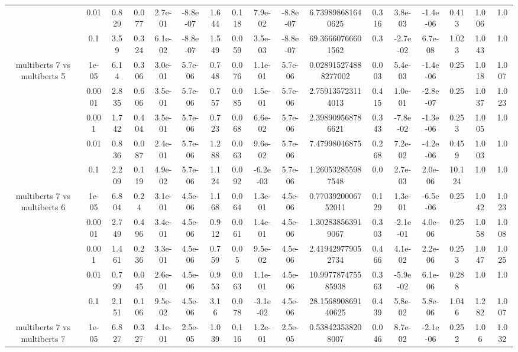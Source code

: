 \begin{tabular}{|c|c|c|c|c|c|c|c|c|c|c|c|c|c|c|c|c|}
 & 0.01 & 0.829 & 0.077 & 2.7e-01 & -8.8e-07 & 1.644 & 0.118 & 7.9e-02 & -8.8e-07 & 6.739898681640625 & 0.316 & 3.8e-03 & -1.4e-06 & 0.413 & 1.006 & 1.0 \\
 & 0.1 & 3.59 & 0.324 & 6.1e-02 & -8.8e-07 & 1.549 & 0.059 & 3.5e-03 & -8.8e-07 & 69.36660766601562 & 0.3 & -2.7e-02 & 6.7e-08 & 1.023 & 1.043 & 1.0 \\
\hline
\multirow{5}{*}{multiberts 7 vs multiberts 5} & 1e-05 & 6.14 & 0.306 & 3.0e-01 & 5.7e-06 & 0.748 & 0.076 & 1.1e-01 & 5.7e-06 & 0.028915274888277002 & 0.003 & 5.4e-03 & -1.4e-06 & 0.25 & 1.018 & 1.007 \\
 & 0.0001 & 2.835 & 0.606 & 3.5e-01 & 5.7e-06 & 0.757 & 0.085 & 1.5e-01 & 5.7e-06 & 2.759135723114013 & 0.415 & 1.0e-01 & -2.8e-07 & 0.25 & 1.037 & 1.023 \\
 & 0.001 & 1.742 & 0.404 & 3.5e-01 & 5.7e-06 & 0.723 & 0.068 & 6.6e-02 & 5.7e-06 & 2.398909568786621 & 0.343 & -7.8e-02 & -1.3e-06 & 0.253 & 1.005 & 1.0 \\
 & 0.01 & 0.836 & 0.087 & 2.4e-01 & 5.7e-06 & 1.288 & 0.063 & 9.6e-02 & 5.7e-06 & 7.47998046875 & 0.268 & 7.2e-02 & -4.2e-06 & 0.459 & 1.003 & 1.0 \\
 & 0.1 & 2.209 & 0.119 & 4.9e-02 & 5.7e-06 & 1.124 & 0.092 & -6.2e-03 & 5.7e-06 & 1.260532855987548 & 0.0 & 2.7e-03 & 2.0e-06 & 10.124 & 1.0 & 1.0 \\
\hline
\multirow{5}{*}{multiberts 7 vs multiberts 6} & 1e-05 & 6.804 & 0.24 & 3.1e-01 & 4.5e-06 & 1.168 & 0.064 & 1.3e-01 & 4.5e-06 & 0.7703920006752011 & 0.129 & 1.3e-01 & -6.5e-06 & 0.25 & 1.042 & 1.023 \\
 & 0.0001 & 2.749 & 0.496 & 3.4e-01 & 4.5e-06 & 0.912 & 0.061 & 1.4e-01 & 4.5e-06 & 1.302838563919067 & 0.303 & -2.1e-01 & 4.0e-06 & 0.25 & 1.058 & 1.008 \\
 & 0.001 & 1.461 & 0.236 & 3.3e-01 & 4.5e-06 & 0.759 & 0.05 & 9.5e-02 & 4.5e-06 & 2.419429779052734 & 0.466 & 4.1e-02 & 2.2e-06 & 0.253 & 1.047 & 1.025 \\
 & 0.01 & 0.799 & 0.045 & 2.6e-01 & 4.5e-06 & 0.953 & 0.063 & 1.1e-01 & 4.5e-06 & 10.997787475585938 & 0.363 & -5.9e-02 & 6.1e-06 & 0.288 & 1.0 & 1.0 \\
 & 0.1 & 2.151 & 0.106 & 9.5e-02 & 4.5e-06 & 3.16 & 0.078 & -3.1e-02 & 4.5e-06 & 28.156890869140625 & 0.439 & 5.8e-02 & 5.8e-06 & 1.046 & 1.282 & 1.007 \\
\hline
\multirow{5}{*}{multiberts 7 vs multiberts 7} & 1e-05 & 6.827 & 0.327 & 4.1e-01 & 2.5e-05 & 1.039 & 0.116 & 1.2e-01 & 2.5e-05 & 0.538423538208007 & 0.046 & 8.7e-02 & -2.1e-06 & 0.252 & 1.06 & 1.032 \\

\end{tabular}
